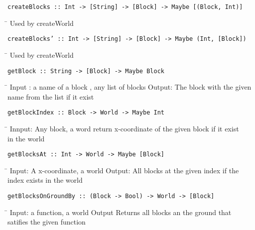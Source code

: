 \begin{verbatim}
createBlocks :: Int -> [String] -> [Block] -> Maybe [(Block, Int)]
\end{verbatim}
\begin{tabbing}
\hspace*{1cm}\= \kill
\> Used by createWorld
\end{tabbing}
\begin{verbatim}
createBlocks’ :: Int -> [String] -> [Block] -> Maybe (Int, [Block])
\end{verbatim}
\begin{tabbing}
\hspace*{1cm}\= \kill
\> Used by createWorld
\end{tabbing}
\begin{verbatim}
getBlock :: String -> [Block] -> Maybe Block
\end{verbatim}
\begin{tabbing}
\hspace*{1cm}\= \kill
\> Input : a name of a block , any list of blocks Output: The block with the given \\
\> name from the list if it exist
\end{tabbing}
\begin{verbatim}
getBlockIndex :: Block -> World -> Maybe Int
\end{verbatim}
\begin{tabbing}
\hspace*{1cm}\= \kill
\> Innput: Any block, a word return x-coordinate of the given block if it exist \\
\> in the world
\end{tabbing}
\begin{verbatim}
getBlocksAt :: Int -> World -> Maybe [Block]
\end{verbatim}
\begin{tabbing}
\hspace*{1cm}\= \kill
\> Input: A x-coordinate, a world Output: All blocks at the given index if the \\
\> index exists in the world
\end{tabbing}
\begin{verbatim}
getBlocksOnGroundBy :: (Block -> Bool) -> World -> [Block]
\end{verbatim}
\begin{tabbing}
\hspace*{1cm}\= \kill
\> Input: a function, a world Output Returns all blocks an the ground that \\
\> satifies the given function
\end{tabbing}
